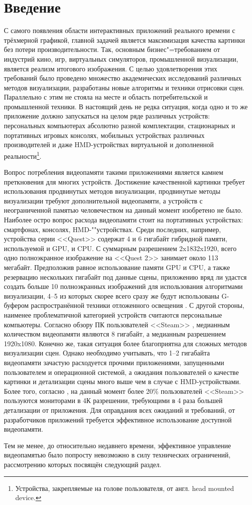 \section{Введение}
С самого появления области интерактивных приложений реального времени с трёхмерной графикой, главной задачей является максимизация качества картинки без потери производительности.
Так, основным бизнес"=требованием от индустрий кино, игр, виртуальных симуляторов, промышленной визуализации, является реализм итогового изображения.
С целью удовлетворения этих требований было проведено множество академических исследований различных методов визуализации, разработаны новые алгоритмы и техники отрисовки сцен.
Параллельно с этим не стояла на месте и область потребительской и промышленной техники.
В настоящий день не редка ситуация, когда одно и то же приложение должно запускаться на целом ряде различных устройств: персональных компьютерах абсолютно разной комплектации, стационарных и портативных игровых консолях, мобильных устройствах различных производителей и даже HMD-устройствах виртуальной и дополненной реальности\footnote{Устройства, закрепляемые на голове пользователя, от англ. head mounted device.}.

Вопрос потребления видеопамяти такими приложениями является камнем преткновения для многих устройств.
Достижение качественной картинки требует использования продвинутых методов визуализации, продвинутые методы визуализации требуют дополнительной видеопамяти, а устройств с неограниченной памятью человечеством на данный момент изобретено не было.
Наиболее остро вопрос расхода видеопамяти стоит на портативных устройствах: смартфонах, консолях, HMD-""устройствах.
Среди последних, например, устройства серии <<Quest>> содержат 4 и 6 гигабайт гибридной памяти, используемой и GPU, и CPU.
С суммарным разрешением 2x1832x1920, всего одно полноэкранное изображение на <<Quest 2>> занимает около 113 мегабайт.
Предположив равное использование памяти GPU и CPU, а также резервацию нескольких гигабайт под данные сцены, приложению вряд ли удастся создать больше 10 полноэкранных изображений для использования алгоритмами визуализации, 4--5 из которых скорее всего сразу же будут использованы G-буфером распространённой техники отложенного освещения \cite{10.1145/54852.378468}.
С другой стороны, наименее проблематичной категорией устройств считаются персональные компьютеры. Согласно обзору ПК пользователей <<Steam>> \cite{steamSurvey2023may}, медианным количеством видеопамяти являются 8 гигабайт, а медианным разрешением 1920x1080. Конечно же, такая ситуация более благоприятна для сложных методов визуализации сцен. Однако необходимо учитывать, что 1--2 гигабайта видеопамяти зачастую расходуется прочими приложениями, запущенными пользователем и операционной системой, а ожидания пользователей о качестве картинки и детализации сцены много выше чем в случае с HMD-устройствами. Более того, согласно \cite{steamSurvey2023may}, на данный момент более 20\% пользователей <<Steam>> пользуются мониторами в 4К разрешении, требующими в 4 раза большей детализации от приложения. Для оправдания всех ожиданий и требований, от разработчиков приложений требуется эффективное использование доступной видеопамяти.

Тем не менее, до относительно недавнего времени, эффективное управление видеопамятью было попросту невозможно в силу технических ограничений, рассмотрению которых посвящён следующий раздел.
